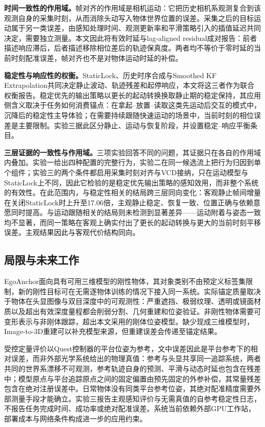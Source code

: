 \documentclass[review]{vgtc}
\begin{document}
\textbf{时间一致性的作用域。}帧对齐的作用域是相机运动：它把历史相机系观测复合到该观测自身的采集时刻，从而消除头动写入物体世界位置的误差。采集之后的目标运动属于另一类误差，由感知处理时间、观测更新率和平滑策略引入的插值延迟共同决定，需要独立测量。本文因此将有效时延与lag-aligned residual成对报告：前者描述响应滞后，后者描述移除相位差后的轨迹保真度。两者均不等价于零时延的当前时刻配准误差，帧对齐也不是对物体运动时延的补偿。

\textbf{稳定性与响应性的权衡。}StaticLock、历史时序合成与Smoothed KF Extrapolation共同决定静止波动、轨迹残差和起停响应，本文将这三者作为联合权衡报告。稳定优先的输出策略以更长的起动转换换取静止期的稳定保持，其应用侧含义取决于任务如何消费锚点：在拿起--放置--读取这类先运动后交互的模式中，沉降后的稳定性主导体验；在需要持续跟随快速运动的场景中，当前时刻的相位误差是主要限制。实验三据此区分静止、运动与恢复阶段，并设置稳定--响应平衡条目。

\textbf{三层证据的一致性与作用域。}三项实验回答不同的问题，其证据只在各自的作用域内叠加。实验一给出四种配置的完整行为，实验二在同一候选流上把行为归因到单个组件；实验三的两个条件都启用采集时刻对齐与VCD接纳，只在运动模型与StaticLock上不同，因此它检验的是稳定优先输出策略的感知效用，而非整个系统的有效性。在此范围内，与稳定性相关的结局跨三层同向变化：客观静止帧间增量在关闭StaticLock时上升至17.06倍，主观静止稳定、恢复一致、位置正确与依赖意愿同时提高。与运动跟随相关的结局则未检测到显著差异——运动附着与姿态一致均不显著，而同一策略在客观上确实付出了更长的起动转换与更大的当前时刻平移误差。主观结果因此与客观代价结构同向。

\subsection{局限与未来工作}

EgoAnchor面向具有可用三维模型的刚性物体，其对象类别不由预定义标签集限制，新的刚性目标可在无需逐物体训练的情况下接入同一系统。实际锚定质量取决于物体在头显图像与双目深度中的可观测性：严重遮挡、极弱纹理、透明或镜面材质以及超出有效深度量程都会削弱分割、几何重建和位姿验证。非刚性物体需要可变形表示与非刚体跟踪，超出本文采用的刚体位姿模型。缺少现成三维模型时，Image-to-3D重建可以补充模型来源，但重建误差会传递至锚定结果。

受控定量评价以Quest控制器的平台位姿为参考，文中误差因此是平台参考下的相对误差，而非外部光学系统给出的物理真值：参考与头显共享同一追踪系统，两者共同的世界系漂移不可观测，参考轨迹自身的预测、平滑与动态时延也包含在残差中；模型原点与平台追踪原点之间的固定偏置由预先固定的外参补偿，其常量残差包含在绝对注册误差中。日常物体没有同类平台参考位姿，其绝对配准精度需要外部测量手段才能确立。实验三报告主观感知评价与无需真值的自参考稳定性日志，不报告任务完成时间、成功率或绝对配准误差。系统当前依赖外部GPU工作站，部署成本与网络条件构成进一步的应用约束。
\end{document}
